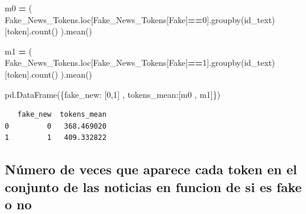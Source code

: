 \documentclass[
  11pt,
  a4paper,
]{article}
\newenvironment{Shaded}{\begin{snugshade}}{\end{snugshade}}
\newcommand{\DecValTok}[1]{\textcolor[rgb]{0.00,0.00,0.81}{#1}}
\newcommand{\NormalTok}[1]{#1}
\newcommand{\OperatorTok}[1]{\textcolor[rgb]{0.81,0.36,0.00}{\textbf{#1}}}
\newcommand{\StringTok}[1]{\textcolor[rgb]{0.31,0.60,0.02}{#1}}
\begin{document}
\begin{Shaded}
\begin{Highlighting}[]
\NormalTok{m0 }\OperatorTok{=}\NormalTok{ ( Fake\_News\_Tokens.loc[Fake\_News\_Tokens[}\StringTok{\textquotesingle{}Fake\textquotesingle{}}\NormalTok{]}\OperatorTok{==}\DecValTok{0}\NormalTok{].groupby(}\StringTok{\textquotesingle{}id\_text\textquotesingle{}}\NormalTok{)[}\StringTok{\textquotesingle{}token\textquotesingle{}}\NormalTok{].count() ).mean()}
\end{Highlighting}
\end{Shaded}

\begin{Shaded}
\begin{Highlighting}[]
\NormalTok{m1 }\OperatorTok{=}\NormalTok{ ( Fake\_News\_Tokens.loc[Fake\_News\_Tokens[}\StringTok{\textquotesingle{}Fake\textquotesingle{}}\NormalTok{]}\OperatorTok{==}\DecValTok{1}\NormalTok{].groupby(}\StringTok{\textquotesingle{}id\_text\textquotesingle{}}\NormalTok{)[}\StringTok{\textquotesingle{}token\textquotesingle{}}\NormalTok{].count() ).mean()}
\end{Highlighting}
\end{Shaded}

\begin{Shaded}
\begin{Highlighting}[]
\NormalTok{pd.DataFrame(\{}\StringTok{\textquotesingle{}fake\_new\textquotesingle{}}\NormalTok{: [}\DecValTok{0}\NormalTok{,}\DecValTok{1}\NormalTok{] , }\StringTok{\textquotesingle{}tokens\_mean\textquotesingle{}}\NormalTok{:[m0 , m1]\})}
\end{Highlighting}
\end{Shaded}

\begin{verbatim}
   fake_new  tokens_mean
0         0   368.469020
1         1   409.332822
\end{verbatim}

\hypertarget{nuxfamero-de-veces-que-aparece-cada-token-en-el-conjunto-de-las-noticias-en-funcion-de-si-es-fake-o-no}{%
\subsection{Número de veces que aparece cada token en el conjunto de las
noticias en funcion de si es fake o
no}\label{nuxfamero-de-veces-que-aparece-cada-token-en-el-conjunto-de-las-noticias-en-funcion-de-si-es-fake-o-no}}
\end{document}

